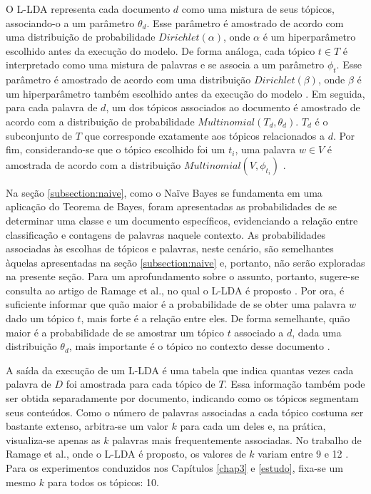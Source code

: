 
O L-LDA representa cada documento \ensuremath{d} como uma mistura de seus tópicos, associando-o a um parâmetro \ensuremath{\theta_d}. Esse parâmetro é amostrado de acordo com uma distribuição de probabilidade \ensuremath{Dirichlet(\alpha)}, onde \ensuremath{\alpha} é um hiperparâmetro escolhido antes da execução do modelo. De forma análoga, cada tópico \ensuremath{t \in T} é interpretado como uma mistura de palavras e se associa a um parâmetro \ensuremath{\phi_t}. Esse parâmetro é amostrado de acordo com uma distribuição \ensuremath{Dirichlet(\beta)}, onde \ensuremath{\beta} é um hiperparâmetro também escolhido antes da execução do modelo \cite{pnas}. Em seguida, para cada palavra de \ensuremath{d}, um dos tópicos associados ao documento é amostrado de acordo com a distribuição de probabilidade \ensuremath{Multinomial(T_d, \theta_d)}. \ensuremath{T_d} é o subconjunto de \ensuremath{T} que corresponde exatamente aos tópicos relacionados a \ensuremath{d}. Por fim, considerando-se que o tópico escolhido foi um \ensuremath{t_i}, uma palavra \ensuremath{w \in V} é amostrada de acordo com a distribuição \ensuremath{Multinomial(V, \phi_{t_i})} \cite{blei}.

Na seção \ref{subsection:naive}, como o Naïve Bayes se fundamenta em uma aplicação do Teorema de Bayes, foram apresentadas as probabilidades de se determinar uma classe e um documento específicos, evidenciando a relação entre classificação e contagens de palavras naquele contexto. As probabilidades associadas às escolhas de tópicos e palavras, neste cenário, são semelhantes àquelas apresentadas na seção \ref{subsection:naive} e, portanto, não serão exploradas na presente seção. Para um aprofundamento sobre o assunto, portanto, sugere-se consulta ao artigo de Ramage et al., no qual o L-LDA é proposto \cite{llda}. Por ora, é suficiente informar que quão maior é a probabilidade de se obter uma palavra \ensuremath{w} dado um tópico \ensuremath{t}, mais forte é a relação entre eles. De forma semelhante, quão maior é a probabilidade de se amostrar um tópico \ensuremath{t} associado a \ensuremath{d}, dada uma distribuição \ensuremath{\theta_d}, mais importante é o tópico no contexto desse documento \cite{pnas}.

A saída da execução de um L-LDA é uma tabela que indica quantas vezes cada palavra de \ensuremath{D} foi amostrada para cada tópico de \ensuremath{T}. Essa informação também pode ser obtida separadamente por documento, indicando como os tópicos segmentam seus conteúdos. Como o número de palavras associadas a cada tópico costuma ser bastante extenso, arbitra-se um valor \ensuremath{k} para cada um deles e, na prática, visualiza-se apenas as \ensuremath{k} palavras mais frequentemente associadas. No trabalho de Ramage et al., onde o L-LDA é proposto, os valores de \ensuremath{k} variam entre 9 e 12 \cite{llda}. Para os experimentos conduzidos nos Capítulos \ref{chap3} e \ref{estudo}, fixa-se um mesmo \ensuremath{k} para todos os tópicos: 10.  

